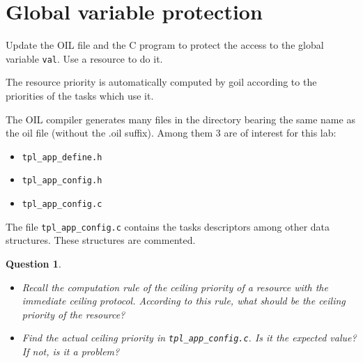 \documentclass[11pt]{report}
\newtheorem{ex}{Question}
\newcommand{\unixcl}[1]{\texttt{\fcolorbox{black}{gray!20}{\footnotesize#1}}}
\begin{document}




\section{Global variable protection}


Update the OIL file and the C program to protect the access to the global variable \texttt{val}. Use a resource to do it.

The resource priority is automatically computed by goil according to the priorities of the tasks which use it.

The OIL compiler generates many files in the directory bearing the same name as the oil file (without the .oil suffix). Among them 3 are of interest for this lab:
\begin{itemize}
\item \texttt{tpl_app_define.h}
\item \texttt{tpl_app_config.h}
\item \texttt{tpl_app_config.c}
\end{itemize}

The file \texttt{tpl_app_config.c} contains the tasks descriptors among other data structures. These structures are commented.

\begin{ex} ~
    \begin{itemize}
        \item
            Recall the computation rule of the ceiling priority of a resource with the immediate ceiling protocol.
            According to this rule, what should be the ceiling priority of the resource?
        \item
            Find the actual ceiling priority in \texttt{tpl_app_config.c}. Is it the expected value? If not, is it a problem?
    \end{itemize}
\end{ex}

\end{document}
